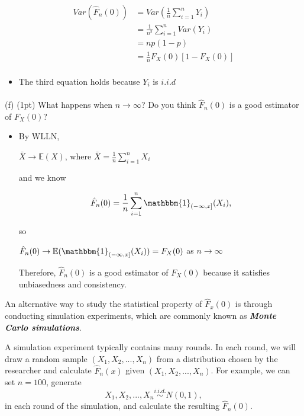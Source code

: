 \documentclass[11pt, oneside]{article}   	%
\begin{document}
\begin{align*}
Var(\hat{F}_n(0)) &= Var(\frac{1}{n}\sum_{i=1}^n Y_i)\\
&= \frac{1}{n^2}\sum_{i=1}^n Var(Y_i)\\
&= np(1-p)\\
&= \frac{1}{n}F_X(0)[1-F_X(0)]\\
\end{align*}

\begin{itemize}
    \item[] The third equation holds because $Y_i$ is $i.i.d$
\end{itemize}



\paragraph{}
(f) (1pt) What happens when $n\rightarrow\infty$? 
Do you think $\hat{F}_n(0)$ is a good estimator of $F_X(0)$?
\begin{itemize}
    \item[]
    By WLLN, 
    \begin{center}
         $\bar{X}\rightarrow \mathbb{E}(X)$, where $\bar{X} = \frac{1}{n}\sum_{i=1}^n X_i$ \\
    \end{center}
    and we know 
    
    \[
    \hat{F}_n(0)=\frac{1}{n}\sum_{i=1}^n\mathbbm{1}_{(-\infty,x]}(X_i), 
    \]
    
    so 
    \begin{center}
        $\hat{F}_n(0)\rightarrow \mathbb{E}(\mathbbm{1}_{(-\infty,x]}(X_i)) = F_X(0)$ 
        as
        $n \rightarrow \infty$
    \end{center}

    Therefore, $\hat{F}_n(0)$ is a good estimator of  $F_X(0)$ because it satisfies unbiasedness and consistency.
\end{itemize}

An alternative way to study the statistical property of $\hat{F}_x(0)$ is through conducting simulation experiments, which are commonly known as \textbf{\textit{Monte Carlo simulations}}. 

A simulation experiment typically contains many rounds. 
In each round, we will draw a random sample $(X_1, X_2, ..., X_n)$ from a 
distribution chosen by the researcher and calculate $\hat{F}_n(x)$ 
given $(X_1, X_2, ..., X_n)$. For example, we can set $n=100$, generate
\[
X_1, X_2, ..., X_n \overset{i.i.d.}{\sim} N(0,1), 
\]
in each round of the simulation, and calculate the resulting $\hat{F}_n(0)$.
\end{document}
